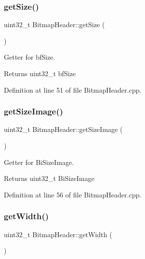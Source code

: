 \subsubsection{\texorpdfstring{getSize()}{getSize()}}
{\footnotesize\ttfamily uint32\+\_\+t Bitmap\+Header\+::get\+Size (\begin{DoxyParamCaption}{ }\end{DoxyParamCaption})}



Getter for bf\+Size. 

\begin{DoxyReturn}{Returns}
uint32\+\_\+t bf\+Size 
\end{DoxyReturn}


Definition at line 51 of file Bitmap\+Header.\+cpp.

\mbox{\label{classBitmapHeader_aa55f157d6852ce35add8c5db54ccadae}} 
\subsubsection{\texorpdfstring{getSizeImage()}{getSizeImage()}}
{\footnotesize\ttfamily uint32\+\_\+t Bitmap\+Header\+::get\+Size\+Image (\begin{DoxyParamCaption}{ }\end{DoxyParamCaption})}



Getter for Bi\+Size\+Image. 

\begin{DoxyReturn}{Returns}
uint32\+\_\+t Bi\+Size\+Image 
\end{DoxyReturn}


Definition at line 56 of file Bitmap\+Header.\+cpp.

\mbox{\label{classBitmapHeader_af1d36ee9f3315866f05c39c2f4871e09}} 
\subsubsection{\texorpdfstring{getWidth()}{getWidth()}}
{\footnotesize\ttfamily uint32\+\_\+t Bitmap\+Header\+::get\+Width (\begin{DoxyParamCaption}{ }\end{DoxyParamCaption})}



